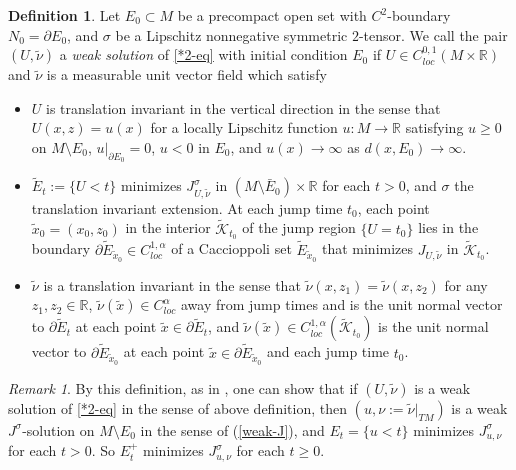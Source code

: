 \documentclass[11pt, letterpaper]{amsart}
\theoremstyle{definition}
\newtheorem{defn}{Definition}[section]
\theoremstyle{remark}
\newtheorem{rmk}{Remark}[section]
\begin{document}
	\begin{defn}\label{defn-weak}
	Let $E_0 \subset M$ be a precompact open set with $C^2$-boundary $N_0= \partial E_0$, and $\sigma $ be a Lipschitz nonnegative symmetric $2$-tensor. We call the pair $(U, \tilde{\nu })$ a \textit{weak solution} of \ref{*2-eq} with initial condition $E_0$ if $U \in C^{0,1}_{loc}(M \times \mathbb{R})$ and $\tilde{\nu } $ is a measurable unit vector field which satisfy
	\begin{itemize}
		\item [(i)] $U$ is translation invariant in the vertical direction in the sense that $U(x,z) = u(x)$ for a locally Lipschitz function $u: M \to \mathbb{R}$ satisfying $u \geq 0$ on $M \setminus E_0$, $u|_{\partial E_0} =0$, $u<0$ in $E_0$, and $u(x) \to \infty$ as $d(x, E_0) \to \infty$.
		\item [(ii)] $\tilde{E}_t := \{ U< t\} $ minimizes $J_{U, \tilde{\nu }} ^{\sigma }$ in $(M\setminus \bar{E}_0) \times \mathbb{R}$ for each $t>0$, and $\sigma $ the translation invariant extension. At each jump time $t_0$, each point $\tilde{x}_0=(x_0, z_0)$ in the interior $\tilde{\mathcal{K}}_{t_0}$ of the jump region $\{U = t_0\} $ lies in the boundary $\partial \tilde{E}_{\tilde{x}_0} \in C^{1,\alpha }_{loc}$ of a Caccioppoli set $\tilde{E}_{\tilde{x}_0}$ that minimizes $J_{U, \tilde{\nu }}$ in $\tilde{\mathcal{K}}_{t_0}$.
		\item [(iii)] $\tilde{\nu }$ is a translation invariant in the sense that $\tilde{\nu }(x, z_1) = \tilde{\nu} (x, z_2)$ for any $z_1, z_2 \in \mathbb{R}$, $\tilde{\nu }(\tilde{x}) \in C^{\alpha }_{loc}$ away from jump times and is the unit normal vector to $\partial \tilde{E}_t$ at each point $\tilde{x} \in \partial \tilde{E}_t$, and $\tilde{\nu }(\tilde{x}) \in C^{1,\alpha }_{loc}(\tilde{\mathcal{K}}_{t_0}) $ is the unit normal vector to $\partial \tilde{E}_{\tilde{x}_0}$ at each point $\tilde{x} \in \partial \tilde{E}_{\tilde{x}_0}$ and each jump time $t_0$.
	\end{itemize}
\end{defn}
\begin{rmk}\label{rmk-defn-weak}
	By this definition, as in \cite[Lemma 16]{Moore12}, one can show that if $(U, \tilde{\nu })$ is a weak solution of \ref{*2-eq} in the sense of above definition, then $(u, \nu:= \tilde{\nu }|_{TM} )$ is a weak $J^{\sigma }$-solution on $M \setminus E_0$ in the sense of (\ref{weak-J}), and $E_t= \{ u<t\} $ minimizes $J_{u, \nu } ^{\sigma }$ for each $t>0$. So $E_t^+$ minimizes $J^{\sigma }_{u, \nu }$ for each $t \geq 0$.
\end{rmk}
\end{document}
